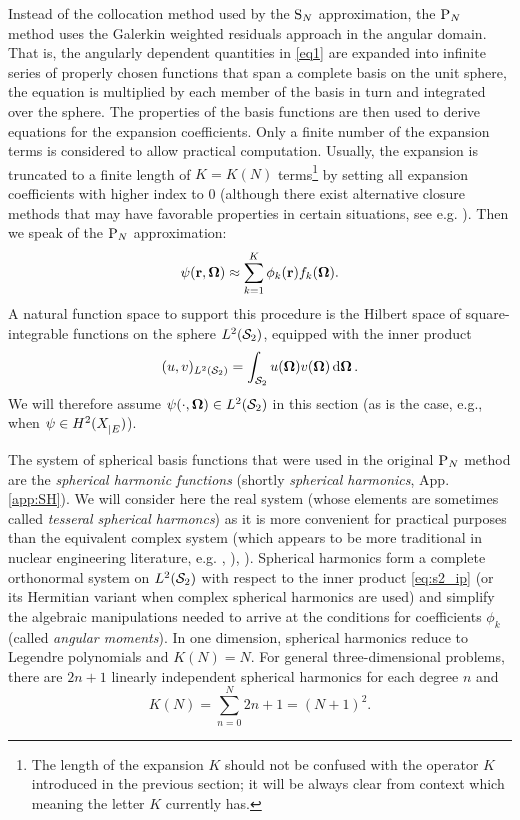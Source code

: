 Instead of the collocation method used by the $\SN$ approximation, the $\PN$ method uses the Galerkin weighted residuals
approach in the angular domain. That is, the angularly dependent quantities in \eqref{eq1} are expanded into infinite
series of properly chosen functions that span a complete basis on the unit sphere, the equation is multiplied by each member of the basis in turn
and integrated over the sphere. The properties of the basis functions are then used to derive equations for
the expansion coefficients. Only a finite number of the expansion terms is considered to allow practical computation.
Usually, the expansion is truncated to a finite length of $K = K(N)$ terms\footnote{The length of the expansion $K$
should not be confused with the operator $K$ introduced in the previous section; it will be always clear from context 
which meaning the letter $K$ currently has.} by setting all expansion coefficients with higher index to 0 (although there exist alternative closure methods that may have favorable properties in certain situations, see e.g.
\cite{Frank0}). Then we speak of the $\PN$ approximation:
\begin{equation}\label{eq1.1}
  \psi(\br,\bomega) \approx \sum_{k=1}^{ K} \phi_k(\br) f_k(\bomega).
\end{equation}
A natural function space to support this procedure is the Hilbert space of 
square-integrable functions on the sphere $\Lp[2](\Sphere)$, equipped with the inner product
\begin{equation}\label{eq:s2_ip}
	(u, v)_{\Lp[2](\Sphere)} = \intA{u(\bomega) {v(\bomega)}}.
\end{equation}
We will therefore assume \mbox{$\psi(\cdot,\bomega)\in\Lp[2](\Sphere)$} in this section (as is the case, e.g., when 
$\psi\in\Hp[2](\XE)$).

The system of spherical basis functions that were used in the original $\PN$ method are the
\textit{spherical harmonic functions} (shortly \textit{spherical harmonics}, App. \ref{app:SH}). We will consider
here the real system (whose elements are sometimes called \textit{tesseral spherical harmoncs}) as it is more convenient
for practical purposes than the equivalent complex system (which appears to be more traditional in nuclear engineering 
literature, e.g. \cite[Sec. 9.7]{Stacey1}, \cite[Sec. 14.4]{Reuss1}), \cite[Chap. V]{Stammler}). Spherical harmonics
form a complete orthonormal system on $\Lp[2](\Sphere)$ with respect to the inner product \eqref{eq:s2_ip} (or its Hermitian 
variant when complex spherical harmonics are used) and simplify the algebraic manipulations needed to arrive at the 
conditions for coefficients $\phi_k$ (called \textit{angular moments}). In one dimension, spherical harmonics reduce to 
Legendre polynomials and $ K(N) = N$.
For general three-dimensional problems, there are $2n + 1$ linearly independent spherical harmonics for each degree $n$ 
and 
$$ 
	K(N) = \sum_{n=0}^{N} 2n + 1 = (N+1)^2.
$$

